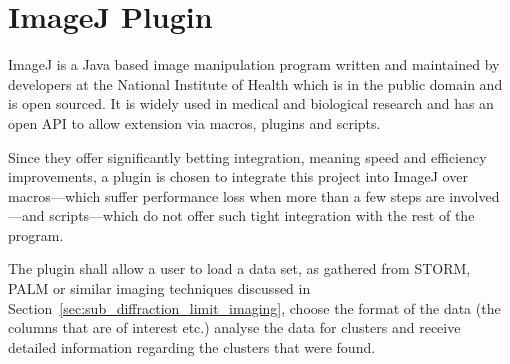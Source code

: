 
\part{ImageJ Plugin}
\label{prt:imagej_plugin}

ImageJ is a Java based image manipulation program written and maintained by
developers at the National Institute of Health which is in the public domain
and is open sourced. It is widely used in medical and biological research and
has an open API to allow extension via macros, plugins and scripts.

Since they offer significantly betting integration, meaning speed and
efficiency improvements, a plugin is chosen to integrate this project into
ImageJ over macros---which suffer performance loss when more than a few steps
are involved---and scripts---which do not offer such tight integration with the
rest of the program.

The plugin shall allow a user to load a data set, as gathered from STORM, PALM
or similar imaging techniques discussed in
Section~\ref{sec:sub_diffraction_limit_imaging}, choose the format of the data
(the columns that are of interest etc.) analyse the data for clusters and
receive detailed information regarding the clusters that were found.
